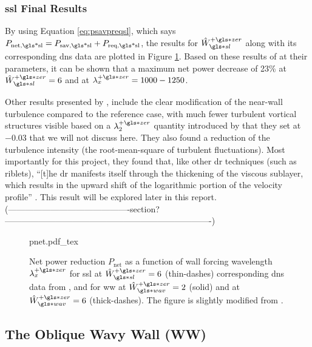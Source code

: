 \subsubsection{\gls{ssl} Final Results}
By using Equation \eqref{eq:psavpreqsl}, which says $P_\text{net,\gls*{sl}}=P_\text{sav,\gls*{sl}}+P_\text{req,\gls*{sl}} $, the results for $\hat{W}\pz\ssl$ along with its corresponding \gls{dns} data are plotted in Figure \ref{fig:pnet}. Based on these results of \textcite{viotti2009} at their parameters, it can be shown that a maximum net power decrease of 23\% at $\hat{W}\pz\ssl=6$ and at $\lambda_x\pz=1000-1250$.

Other results presented by \textcite{viotti2009}, include the clear modification of the near-wall turbulence compared to the reference case, with much fewer turbulent vortical structures visible based on a $\lambda_2\pz$ quantity introduced by \textcite{jeong1995} that they set at $-0.03$ that we will not discuss here. They also found a reduction of the turbulence intensity (the root-mean-square of turbulent fluctuations). Most importantly for this project, they found that, like other \gls{dr} techniques (such as riblets), ``[t]he \gls{dr} manifests itself through the thickening of the viscous sublayer, which results in the upward shift of the logarithmic portion of the velocity profile'' \cite{viotti2009}. This result will be explored later in this report. (-------------------------------------------section?-------------------------------------------------------------------------)

\begin{figure}[htbp]
	\centering
	\def\svgwidth{0.7\textwidth}
	{pnet.pdf_tex}
	\caption[$P_\text{net} $ for SSL and WW as a function of wall forcing wavelength $\lambda_x\pz$]{Net power reduction $P_\text{net}$ as a function of wall forcing wavelength $\lambda_x\pz$ for \gls{ssl} at $\hat{W}\pz\ssl=6$ (thin-dashes) corresponding \gls{dns} data from \textcite{viotti2009}, and for \gls{ww} at $\hat{W}\pz\ww=2$ (solid) and at $\hat{W}\pz\ww=6$ (thick-dashes). The figure is slightly modified from \cite{chernyshenko2013}.} 
	\label{fig:pnet}
\end{figure}

\subsection{The Oblique Wavy Wall (WW)}
